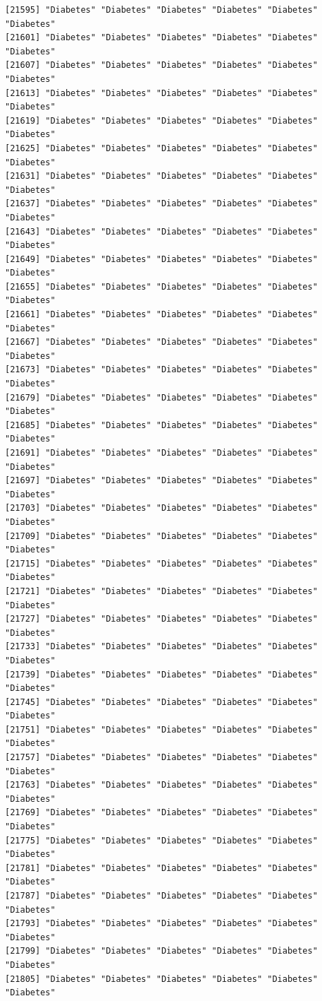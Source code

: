 \documentclass[
  letterpaper,
  DIV=11,
  numbers=noendperiod]{scrartcl}
\begin{document}
\begin{verbatim}
[21595] "Diabetes" "Diabetes" "Diabetes" "Diabetes" "Diabetes" "Diabetes"
[21601] "Diabetes" "Diabetes" "Diabetes" "Diabetes" "Diabetes" "Diabetes"
[21607] "Diabetes" "Diabetes" "Diabetes" "Diabetes" "Diabetes" "Diabetes"
[21613] "Diabetes" "Diabetes" "Diabetes" "Diabetes" "Diabetes" "Diabetes"
[21619] "Diabetes" "Diabetes" "Diabetes" "Diabetes" "Diabetes" "Diabetes"
[21625] "Diabetes" "Diabetes" "Diabetes" "Diabetes" "Diabetes" "Diabetes"
[21631] "Diabetes" "Diabetes" "Diabetes" "Diabetes" "Diabetes" "Diabetes"
[21637] "Diabetes" "Diabetes" "Diabetes" "Diabetes" "Diabetes" "Diabetes"
[21643] "Diabetes" "Diabetes" "Diabetes" "Diabetes" "Diabetes" "Diabetes"
[21649] "Diabetes" "Diabetes" "Diabetes" "Diabetes" "Diabetes" "Diabetes"
[21655] "Diabetes" "Diabetes" "Diabetes" "Diabetes" "Diabetes" "Diabetes"
[21661] "Diabetes" "Diabetes" "Diabetes" "Diabetes" "Diabetes" "Diabetes"
[21667] "Diabetes" "Diabetes" "Diabetes" "Diabetes" "Diabetes" "Diabetes"
[21673] "Diabetes" "Diabetes" "Diabetes" "Diabetes" "Diabetes" "Diabetes"
[21679] "Diabetes" "Diabetes" "Diabetes" "Diabetes" "Diabetes" "Diabetes"
[21685] "Diabetes" "Diabetes" "Diabetes" "Diabetes" "Diabetes" "Diabetes"
[21691] "Diabetes" "Diabetes" "Diabetes" "Diabetes" "Diabetes" "Diabetes"
[21697] "Diabetes" "Diabetes" "Diabetes" "Diabetes" "Diabetes" "Diabetes"
[21703] "Diabetes" "Diabetes" "Diabetes" "Diabetes" "Diabetes" "Diabetes"
[21709] "Diabetes" "Diabetes" "Diabetes" "Diabetes" "Diabetes" "Diabetes"
[21715] "Diabetes" "Diabetes" "Diabetes" "Diabetes" "Diabetes" "Diabetes"
[21721] "Diabetes" "Diabetes" "Diabetes" "Diabetes" "Diabetes" "Diabetes"
[21727] "Diabetes" "Diabetes" "Diabetes" "Diabetes" "Diabetes" "Diabetes"
[21733] "Diabetes" "Diabetes" "Diabetes" "Diabetes" "Diabetes" "Diabetes"
[21739] "Diabetes" "Diabetes" "Diabetes" "Diabetes" "Diabetes" "Diabetes"
[21745] "Diabetes" "Diabetes" "Diabetes" "Diabetes" "Diabetes" "Diabetes"
[21751] "Diabetes" "Diabetes" "Diabetes" "Diabetes" "Diabetes" "Diabetes"
[21757] "Diabetes" "Diabetes" "Diabetes" "Diabetes" "Diabetes" "Diabetes"
[21763] "Diabetes" "Diabetes" "Diabetes" "Diabetes" "Diabetes" "Diabetes"
[21769] "Diabetes" "Diabetes" "Diabetes" "Diabetes" "Diabetes" "Diabetes"
[21775] "Diabetes" "Diabetes" "Diabetes" "Diabetes" "Diabetes" "Diabetes"
[21781] "Diabetes" "Diabetes" "Diabetes" "Diabetes" "Diabetes" "Diabetes"
[21787] "Diabetes" "Diabetes" "Diabetes" "Diabetes" "Diabetes" "Diabetes"
[21793] "Diabetes" "Diabetes" "Diabetes" "Diabetes" "Diabetes" "Diabetes"
[21799] "Diabetes" "Diabetes" "Diabetes" "Diabetes" "Diabetes" "Diabetes"
[21805] "Diabetes" "Diabetes" "Diabetes" "Diabetes" "Diabetes" "Diabetes"

\end{verbatim}
\end{document}
